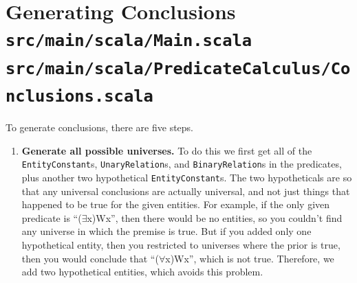\documentclass[a4paper, 11pt]{article}
\begin{document}
\section[Generating Conclusions]{Generating Conclusions
	\\ \normalsize \texttt{src/main/scala/Main.scala}
	\\ \normalsize \texttt{src/main/scala/PredicateCalculus/Conclusions.scala}}
To generate conclusions, there are five steps.
\begin{enumerate}
	\item \textbf{Generate all possible universes.} To do this we first get all of the \texttt{EntityConstant}s, \texttt{UnaryRelation}s, and \texttt{BinaryRelation}s in the predicates, plus another two hypothetical \texttt{EntityConstant}s. The two hypotheticals are so that any universal conclusions are actually universal, and not just things that happened to be true for the given entities. For example, if the only given predicate is ``($\exists$x)Wx'', then there would be no entities, so you couldn't find any universe in which the premise is true. But if you added only one hypothetical entity, then you restricted to universes where the prior is true, then you would conclude that ``($\forall$x)Wx'', which is not true. Therefore, we add two hypothetical entities, which avoids this problem.
    

\end{enumerate}
\end{document}
